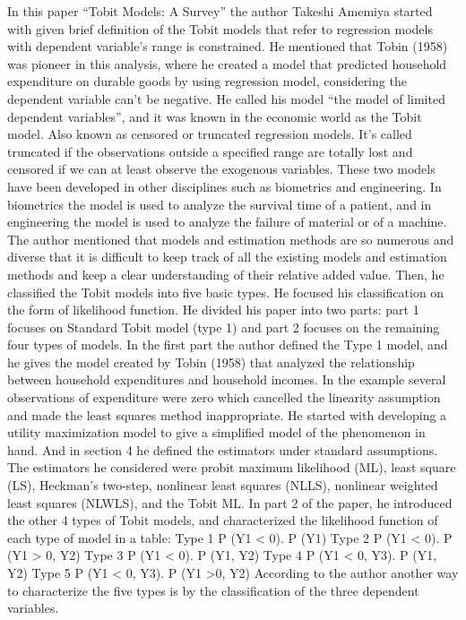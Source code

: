 \documentclass[12pt]{book}
\begin{document}
\vskip 32pt
In this paper “Tobit Models: A Survey” the author Takeshi Amemiya started with given brief definition of the Tobit models that refer to regression models with dependent variable’s range is constrained. 
\vskip 12pt
 He mentioned that Tobin (1958) was pioneer in this analysis, where he created a model that predicted household expenditure on durable goods by using regression model, considering the dependent variable can’t be negative.  He called his model “the model of limited dependent variables”, and it was known in the economic world as the Tobit model. 
\vskip 12pt
Also known as censored or truncated regression models. It’s called truncated if the observations outside a specified range are totally lost and censored if we can at least observe the exogenous variables.  These two models have been developed in other disciplines such as biometrics and engineering. In biometrics the model is used to analyze the survival time of a patient, and in engineering the model is used to analyze the failure of material or of a machine. 
\vskip 12pt
The author mentioned that models and estimation methods are so numerous and diverse that it is difficult to keep track of all the existing models and estimation methods and keep a clear understanding of their relative added value. 
\vskip 12pt
Then, he classified the Tobit models into five basic types. He focused his classification on the form of likelihood function. He divided his paper into two parts: part 1 focuses on Standard Tobit model (type 1) and part 2 focuses on the remaining four types of models.  
\vskip 12pt
In the first part the author defined the Type 1 model, and he gives the model created by Tobin (1958) that analyzed the relationship between household expenditures and household incomes. In the example several observations of expenditure were zero which cancelled the linearity assumption and made the least squares method inappropriate. 
\vskip 12pt
He started with developing a utility maximization model to give a simplified model of the phenomenon in hand.  And in section 4 he defined the estimators under standard assumptions. The estimators he considered were probit maximum likelihood (ML), least square (LS), Heckman’s two-step, nonlinear least squares (NLLS), nonlinear weighted least squares (NLWLS), and the Tobit ML. 
\vskip 12pt
In part 2 of the paper, he introduced the other 4 types of Tobit models, and characterized the likelihood function of each type of model in a table:
Type 1 P (Y1 < 0). P (Y1) 
Type 2 P (Y1 < 0). P (Y1 > 0, Y2)
Type 3 P (Y1 < 0). P (Y1, Y2) 
Type 4 P (Y1 < 0, Y3). P (Y1, Y2)
Type 5 P (Y1 < 0, Y3). P (Y1 >0, Y2) 
\vskip 12pt
According to the author another way to characterize the five types is by the classification of the three dependent variables.  
\end{document}
